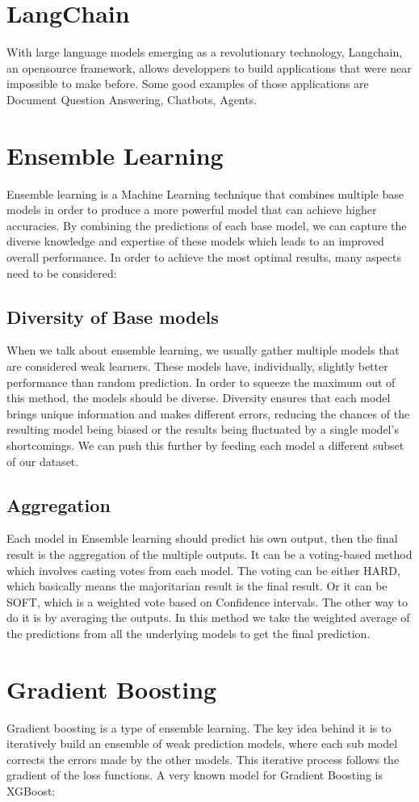 \documentclass[a4paper,12pt,twoside]{report}
\begin{document}
\section{LangChain}
With large language models emerging as a revolutionary technology, Langchain\cite{langchain}, an opensource framework, allows developpers to build applications that were near impossible to make before. Some good examples of those applications are Document Question Answering, Chatbots, Agents.
\section{Ensemble Learning}
Ensemble learning is a Machine Learning technique that combines multiple base models in order to produce a more powerful model that can achieve higher accuracies. By combining the predictions of each base model, we can capture the diverse knowledge and expertise of these models which leads to an improved overall performance. In order to achieve the most optimal results, many aspects need to be considered:
\subsection{Diversity of Base models}
When we talk about ensemble learning, we usually gather multiple models that are considered weak learners. These models have, individually, slightly better performance than random prediction. In order to squeeze the maximum out of this method, the models should be diverse. Diversity ensures that each model brings unique information and makes different errors, reducing the chances of the resulting model being biased or the results being fluctuated by a single model's shortcomings. We can push this further by feeding each model a different subset of our dataset.
\subsection{Aggregation}
Each model in Ensemble learning should predict his own output, then the final result is the aggregation of the multiple outputs. It can be a voting-based method which involves casting votes from each model. The voting can be either HARD, which basically means the majoritarian result is the final result. Or it can be SOFT, which is a weighted vote based on Confidence intervals.
The other way to do it is by averaging the outputs. In this method we take the weighted average of the predictions from all the underlying models to get the final prediction.
\section{Gradient Boosting}
Gradient boosting is a type of ensemble learning. The key idea behind it is to iteratively build an ensemble of weak prediction models, where each sub model corrects the errors made by the other models. This iterative process follows the gradient of the loss functions.
A very known model for Gradient Boosting is XGBoost:
\end{document}
